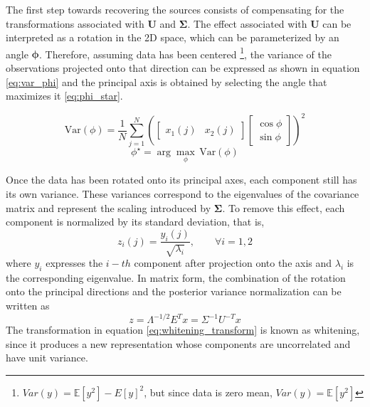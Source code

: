 The first step towards recovering the sources consists of compensating for the transformations associated with $\textbf{U}$ and $\mathbf{\Sigma}$. %
The effect associated with \textbf{U} can be interpreted as a rotation in the 2D space, which can be parameterized by an angle $\mathbf{\phi}$. Therefore, assuming data has been centered \footnote{$Var(y)=\mathbb{E}[y^2]-E[y]^2$, but since data is zero mean, $Var(y)=\mathbb{E}[y^2]$}, the variance of the observations projected onto that direction can be expressed as shown in equation \eqref{eq:var_phi} and the principal axis is obtained by selecting the angle that maximizes it \eqref{eq:phi_star}. 

\begin{equation}
\mathrm{Var}(\phi)=\frac{1}{N}\sum_{j=1}^{N}
\left(
\begin{bmatrix}
x_1(j) & x_2(j)
\end{bmatrix}
\begin{bmatrix}
\cos\phi\\
\sin\phi
\end{bmatrix}
\right)^2
\label{eq:var_phi}
\end{equation}
\begin{equation}
\phi^\star = \arg\max_{\phi}\,\mathrm{Var}(\phi)
\label{eq:phi_star}
\end{equation}

Once the data has been rotated onto its principal axes, each component still has its own variance. These variances correspond to the eigenvalues of the covariance matrix and represent the scaling introduced by $\mathbf{\Sigma}$.  To remove this effect, each component is normalized by its standard deviation, that is, 
\begin{equation}
    z_i(j)=\frac{y_i(j)}{\sqrt{\lambda_i}}, \qquad \forall i=1,2 
\end{equation}
\noindent where $y_i$ expresses the $i-th$ component after projection onto the axis and $\lambda_i $ is the corresponding eigenvalue. In matrix form, the combination of the rotation onto the principal directions and the posterior variance normalization can be written as
\begin{equation}
    z= \Lambda^{-1/2}E^T x = \Sigma^{-1}U^{-T}x
    \label{eq:whitening_transform}
\end{equation}
The transformation in equation \eqref{eq:whitening_transform} is known as whitening, since it produces a new representation whose components are uncorrelated and have unit variance.

